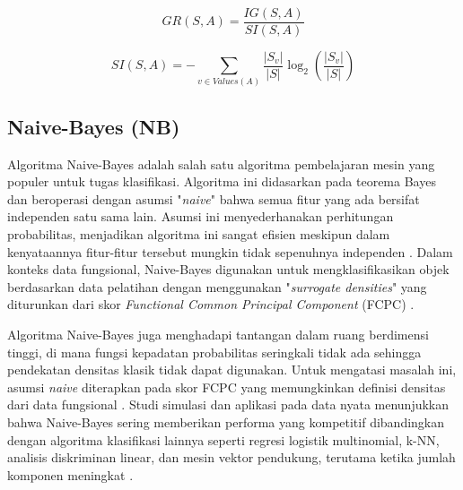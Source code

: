 \documentclass[conference]{IEEEtran}
\begin{document}
\begin{equation}
    GR(S, A) = \frac{IG(S,A)}{SI(S, A)} \label{gain_ratio}
\end{equation}

\begin{equation}
    SI(S, A) = -\sum_{v \in Values(A)} \frac{|S_v|} {|S|} \log_2(\frac{|S_v|} {|S|}) \label{split_info}
\end{equation}

\subsection{Naive-Bayes (NB)}

Algoritma Naive-Bayes adalah salah satu algoritma pembelajaran mesin yang populer untuk tugas klasifikasi. Algoritma ini didasarkan pada teorema Bayes dan beroperasi dengan asumsi "\textit{naive}" 
bahwa semua fitur yang ada bersifat independen satu sama lain. Asumsi ini menyederhanakan perhitungan probabilitas, menjadikan algoritma ini sangat efisien meskipun dalam kenyataannya 
fitur-fitur tersebut mungkin tidak sepenuhnya independen \cite{b19}. Dalam konteks data fungsional, Naive-Bayes digunakan untuk mengklasifikasikan objek berdasarkan data pelatihan dengan 
menggunakan "\textit{surrogate densities}" yang diturunkan dari skor \textit{Functional Common Principal Component} (FCPC) \cite{b18}.

Algoritma Naive-Bayes juga menghadapi tantangan dalam ruang berdimensi tinggi, di mana fungsi kepadatan probabilitas seringkali tidak ada sehingga pendekatan densitas klasik tidak dapat digunakan. 
Untuk mengatasi masalah ini, asumsi \textit{naive} diterapkan pada skor FCPC yang memungkinkan definisi densitas dari data fungsional \cite{b18}. Studi simulasi dan aplikasi pada data nyata menunjukkan 
bahwa Naive-Bayes sering memberikan performa yang kompetitif dibandingkan dengan algoritma klasifikasi lainnya seperti regresi logistik multinomial, k-NN, analisis diskriminan linear, dan mesin vektor pendukung, 
terutama ketika jumlah komponen meningkat \cite{b18}.
\end{document}
